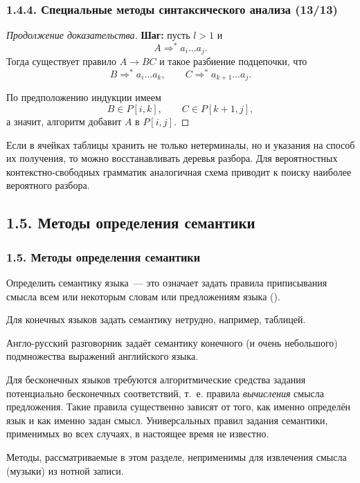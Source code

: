 \begin{frame}
\frametitle{1.4.4. Специальные методы синтаксического анализа (13/13)}

\begin{proof}[Продолжение доказательства]
\textbf{Шаг:} пусть $l>1$ и
\[
A \Rightarrow^* a_i\dots a_j.
\]
Тогда существует правило $A \to BC$ и такое разбиение подцепочки, что
\[
B \Rightarrow^* a_i\dots a_k,
\qquad
C \Rightarrow^* a_{k+1}\dots a_j.
\]

По предположению индукции имеем
\[
B \in P[i,k],\qquad C \in P[k+1,j],
\]
а значит, алгоритм добавит $A$ в $P[i,j]$.
\end{proof}

\begin{digress}
Если в ячейках таблицы хранить не только нетерминалы, но и указания на способ
их получения, то можно восстанавливать деревья разбора. Для вероятностных
контекстно-свободных грамматик аналогичная схема приводит к поиску наиболее
вероятного разбора.
\end{digress}
\end{frame}


\subsection{1.5. Методы определения семантики}\label{1.5.}
\begin{frame}
\frametitle{1.5. Методы определения семантики}
Определить семантику языка~--- это означает задать
правила приписывания смысла всем или некоторым 
словам или предложениям языка ().

\smallskip
Для конечных языков задать семантику нетрудно, например, таблицей.

\begin{example} Англо-русский разговорник задаёт
семантику конечного (и очень небольшого) подмножества
выражений английского языка.
\end{example}

\smallskip

Для бесконечных языков требуются алгоритмические средства
задания потенциально бесконечных соответствий, т.~е.
правила {\em вычисления} смысла предложения.
Такие правила существенно зависят от того,
как именно определён язык и как именно задан смысл.
Универсальных правил задания семантики, применимых во всех случаях,
в настоящее время не известно.

\begin{example} Методы, рассматриваемые в этом разделе,
неприменимы для извлечения смысла (музыки) из нотной записи.
\end{example}

\end{frame}

